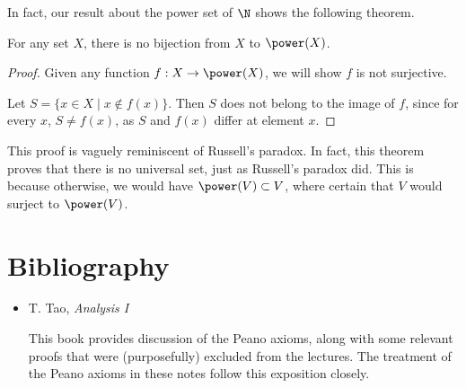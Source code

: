\documentclass[a4paper]{scrreprt}
\begin{document}

In fact, our result about the power set of $\N$ shows the following theorem.
\begin{theorem}
	For any set $X$, there is no bijection from $X$ to $\power(X)$.
\end{theorem}
\begin{proof}
	Given any function $f: X \rightarrow \power(X)$, we will show $f$ is not surjective.

	Let $S = \{x \in X \mid x \not \in f(x) \}$. Then $S$ does not belong to the image of $f$, since for every $x$, $S \neq f(x)$, as $S$ and $f(x)$ differ at element $x$.
\end{proof}

\begin{remark}
	This proof is vaguely reminiscent of Russell's paradox. In fact, this theorem proves that there is no universal set, just as Russell's paradox did. This is because otherwise, we would have $\power(V) \subset V$, where certain that $V$ would surject to $\power(V)$.
\end{remark}
 


\clearpage
\chapter*{Bibliography}

\begin{itemize}
	\item T. Tao, \emph{Analysis I}
	
	This book provides discussion of the Peano axioms, along with some relevant proofs that were (purposefully) excluded from the lectures. The treatment of the Peano axioms in these notes follow this exposition closely.
\end{itemize}




\end{document}
